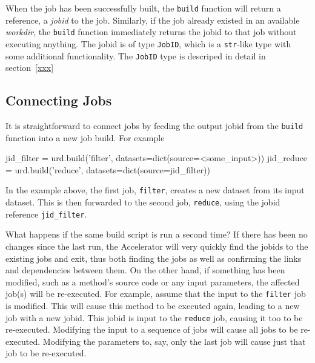 When the job has been successfully built, the \texttt{build} function
will return a reference, a \textsl{jobid} to the job.  Similarly, if
the job already existed in an available \textsl{workdir}, the
\texttt{build} function immediately returns the jobid to that job
without executing anything.  The jobid is of type \texttt{JobID},
which is a \texttt{str}-like type with some additional functionality.
The \texttt{JobID} type is descriped in detail in section~\ref{xxx}



\subsection{Connecting Jobs}
It is straightforward to connect jobs by feeding the output jobid from
the \texttt{build} function into a new job build.  For example
\begin{python}
jid_filter = urd.build('filter', datasets=dict(source=<some_input>))
jid_reduce = urd.build('reduce', datasets=dict(source=jid_filter))
\end{python}
In the example above, the first job, \texttt{filter}, creates a new
dataset from its input dataset.  This is then forwarded to the second
job, \texttt{reduce}, using the jobid reference \texttt{jid\_filter}.

What happens if the same build script is run a second time?  If there
has been no changes since the last run, the Accelerator will very
quickly find the jobids to the existing jobs and exit, thus both
finding the jobs as well as confirming the links and dependencies
between them.  On the other hand, if something has been modified, such
as a method's source code or any input parameters, the affected job(s)
will be re-executed.  For example, assume that the input to
the \texttt{filter} job is modified.  This will cause this method to
be executed again, leading to a new job with a new jobid.  This jobid
is input to the \texttt{reduce} job, causing it too to be re-executed.
Modifying the input to a sequence of jobs will cause all jobs to be
re-executed.  Modifying the parameters to, say, only the last job will
cause just that job to be re-executed.



